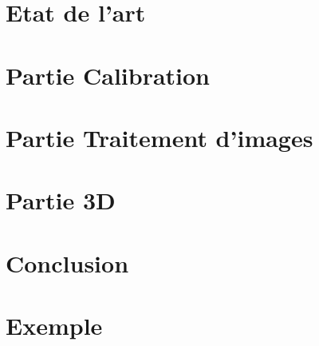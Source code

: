 \documentclass{rapportINSA}
\begin{document}
\section{Etat de l'art}

\newpage


\section{Partie Calibration}
\label{sec:calib}

\newpage


\section{Partie Traitement d'images}
\label{sec:TI}

\newpage


\section{Partie 3D}
\label{sec:3d}

\newpage


\section{Conclusion}
\label{sec:ccl}


\newpage
\section{Exemple}

\end{document}
